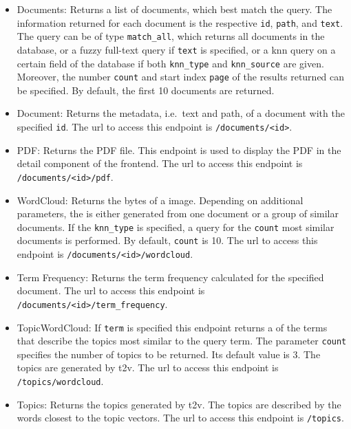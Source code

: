 \begin{itemize}
    \item \label{pt:docs}Documents: 
        Returns a list of documents, which best match the query.
        The information returned for each document is the respective \texttt{id}, \texttt{path}, and \texttt{text}.
        The query can be of type \texttt{match\_all}, which returns all documents in the database, 
        or a fuzzy full-text query if \texttt{text} is specified, 
        or a \ac{knn} query on a certain field of the database if both \texttt{knn\_type} and \texttt{knn\_source} are given.
        Moreover, the number \texttt{count} and start index \texttt{page} of the results returned can be specified.
        By default, the first 10 documents are returned.

    \item \label{pt:doc}Document: 
        Returns the metadata, i.e.\ text and path, of a document with the specified \texttt{id}.
        The \ac{url} to access this endpoint is \texttt{/documents/<id>}.

    \item \label{pt:pdf}PDF: 
        Returns the PDF file.
        This endpoint is used to display the PDF in the detail component of the frontend.
        The \ac{url} to access this endpoint is \texttt{/documents/<id>/pdf}.
    
    \item \label{pt:wordcloud}WordCloud: 
        Returns the bytes of a \wordcloud{} image. 
        Depending on additional parameters, the \wordcloud{} is either generated from one document or 
        a group of similar documents.
        If the \texttt{knn\_type} is specified, a query for the \texttt{count} most similar documents is performed.
        By default, \texttt{count} is 10.
        The \ac{url} to access this endpoint is \texttt{/documents/<id>/wordcloud}.

    \item \label{pt:termfrequency}Term Frequency:
        Returns the term frequency calculated for the specified document.
        The \ac{url} to access this endpoint is \texttt{/documents/<id>/term\_frequency}.
        
    \item \label{pt:topic_wordcloud}TopicWordCloud:
        If \texttt{term} is specified this endpoint returns a \wordcloud{} of the terms that describe the topics most similar to the query term.
        The parameter \texttt{count} specifies the number of topics to be returned.
        Its default value is 3.
        The topics are generated by \ac{t2v}.
        The \ac{url} to access this endpoint is \texttt{/topics/wordcloud}.

    \item \label{pt:topic}Topics: 
        Returns the topics generated by \ac{t2v}. 
        The topics are described by the words closest to the topic vectors.
        The \ac{url} to access this endpoint is \texttt{/topics}.
\end{itemize}

